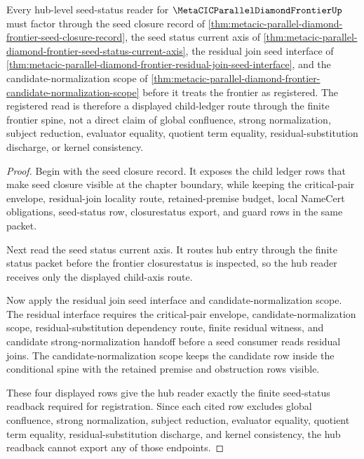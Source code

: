 \begin{theorem}
\label{thm:metacic-parallel-diamond-frontier-seed-status-hub-readback}
Every hub-level seed-status reader for $\MetaCICParallelDiamondFrontierUp$ must factor through the seed closure record of \autoref{thm:metacic-parallel-diamond-frontier-seed-closure-record}, the seed status current axis of \autoref{thm:metacic-parallel-diamond-frontier-seed-status-current-axis}, the residual join seed interface of \autoref{thm:metacic-parallel-diamond-frontier-residual-join-seed-interface}, and the candidate-normalization scope of \autoref{thm:metacic-parallel-diamond-frontier-candidate-normalization-scope} before it treats the frontier as registered. The registered read is therefore a displayed child-ledger route through the finite frontier spine, not a direct claim of global confluence, strong normalization, subject reduction, evaluator equality, quotient term equality, residual-substitution discharge, or kernel consistency.
\end{theorem}
\begin{proof}
Begin with the seed closure record. It exposes the child ledger rows that make seed closure visible at the chapter boundary, while keeping the critical-pair envelope, residual-join locality route, retained-premise budget, local NameCert obligations, seed-status row, closurestatus export, and guard rows in the same packet.

Next read the seed status current axis. It routes hub entry through the finite status packet before the frontier closurestatus is inspected, so the hub reader receives only the displayed child-axis route.

Now apply the residual join seed interface and candidate-normalization scope. The residual interface requires the critical-pair envelope, candidate-normalization scope, residual-substitution dependency route, finite residual witness, and candidate strong-normalization handoff before a seed consumer reads residual joins. The candidate-normalization scope keeps the candidate row inside the conditional spine with the retained premise and obstruction rows visible.

These four displayed rows give the hub reader exactly the finite seed-status readback required for registration. Since each cited row excludes global confluence, strong normalization, subject reduction, evaluator equality, quotient term equality, residual-substitution discharge, and kernel consistency, the hub readback cannot export any of those endpoints.
\end{proof}
